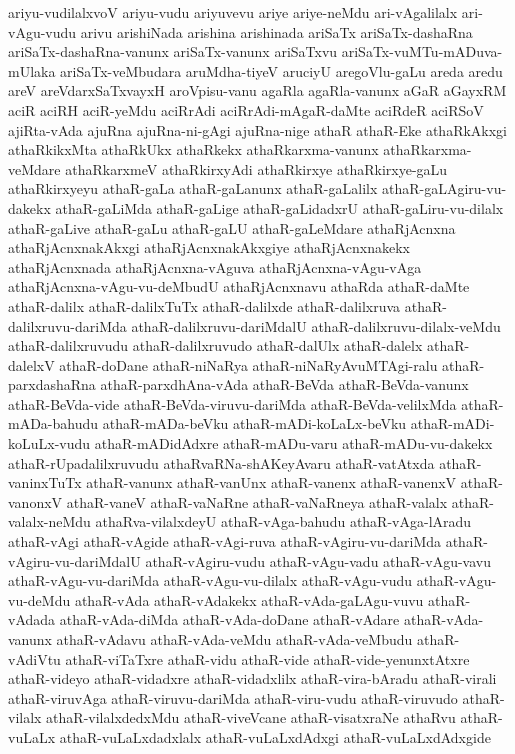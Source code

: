 {ariyu-vudilalxvoV
ariyu-vudu
ariyuvevu
ariye
ariye-neMdu
ari-vAgalilalx
ari-vAgu-vudu
arivu
arishiNada
arishina
arishinada
ariSaTx
ariSaTx-dashaRna
ariSaTx-dashaRna-vanunx
ariSaTx-vanunx
ariSaTxvu
ariSaTx-vuMTu-mADuva-mUlaka
ariSaTx-veMbudara
aruMdha-tiyeV
aruciyU
aregoVlu-gaLu
areda
aredu
areV
areVdarxSaTxvayxH
aroVpisu-vanu
agaRla
agaRla-vanunx
aGaR
aGayxRM
aciR
aciRH
aciR-yeMdu
aciRrAdi
aciRrAdi-mAgaR-daMte
aciRdeR
aciRSoV
ajiRta-vAda
ajuRna
ajuRna-ni-gAgi
ajuRna-nige
athaR
athaR-Eke
athaRkAkxgi
athaRkikxMta
athaRkUkx
athaRkekx
athaRkarxma-vanunx
athaRkarxma-veMdare
athaRkarxmeV
athaRkirxyAdi
athaRkirxye
athaRkirxye-gaLu
athaRkirxyeyu
athaR-gaLa
athaR-gaLanunx
athaR-gaLalilx
athaR-gaLAgiru-vu-dakekx
athaR-gaLiMda
athaR-gaLige
athaR-gaLidadxrU
athaR-gaLiru-vu-dilalx
athaR-gaLive
athaR-gaLu
athaR-gaLU
athaR-gaLeMdare
athaRjAcnxna
athaRjAcnxnakAkxgi
athaRjAcnxnakAkxgiye
athaRjAcnxnakekx
athaRjAcnxnada
athaRjAcnxna-vAguva
athaRjAcnxna-vAgu-vAga
athaRjAcnxna-vAgu-vu-deMbudU
athaRjAcnxnavu
athaRda
athaR-daMte
athaR-dalilx
athaR-dalilxTuTx
athaR-dalilxde
athaR-dalilxruva
athaR-dalilxruvu-dariMda
athaR-dalilxruvu-dariMdalU
athaR-dalilxruvu-dilalx-veMdu
athaR-dalilxruvudu
athaR-dalilxruvudo
athaR-dalUlx
athaR-dalelx
athaR-dalelxV
athaR-doDane
athaR-niNaRya
athaR-niNaRyAvuMTAgi-ralu
athaR-parxdashaRna
athaR-parxdhAna-vAda
athaR-BeVda
athaR-BeVda-vanunx
athaR-BeVda-vide
athaR-BeVda-viruvu-dariMda
athaR-BeVda-velilxMda
athaR-mADa-bahudu
athaR-mADa-beVku
athaR-mADi-koLaLx-beVku
athaR-mADi-koLuLx-vudu
athaR-mADidAdxre
athaR-mADu-varu
athaR-mADu-vu-dakekx
athaR-rUpadalilxruvudu
athaRvaRNa-shAKeyAvaru
athaR-vatAtxda
athaR-vaninxTuTx
athaR-vanunx
athaR-vanUnx
athaR-vanenx
athaR-vanenxV
athaR-vanonxV
athaR-vaneV
athaR-vaNaRne
athaR-vaNaRneya
athaR-valalx
athaR-valalx-neMdu
athaRva-vilalxdeyU
athaR-vAga-bahudu
athaR-vAga-lAradu
athaR-vAgi
athaR-vAgide
athaR-vAgi-ruva
athaR-vAgiru-vu-dariMda
athaR-vAgiru-vu-dariMdalU
athaR-vAgiru-vudu
athaR-vAgu-vadu
athaR-vAgu-vavu
athaR-vAgu-vu-dariMda
athaR-vAgu-vu-dilalx
athaR-vAgu-vudu
athaR-vAgu-vu-deMdu
athaR-vAda
athaR-vAdakekx
athaR-vAda-gaLAgu-vuvu
athaR-vAdada
athaR-vAda-diMda
athaR-vAda-doDane
athaR-vAdare
athaR-vAda-vanunx
athaR-vAdavu
athaR-vAda-veMdu
athaR-vAda-veMbudu
athaR-vAdiVtu
athaR-viTaTxre
athaR-vidu
athaR-vide
athaR-vide-yenunxtAtxre
athaR-videyo
athaR-vidadxre
athaR-vidadxlilx
athaR-vira-bAradu
athaR-virali
athaR-viruvAga
athaR-viruvu-dariMda
athaR-viru-vudu
athaR-viruvudo
athaR-vilalx
athaR-vilalxdedxMdu
athaR-viveVcane
athaR-visatxraNe
athaRvu
athaR-vuLaLx
athaR-vuLaLxdadxlalx
athaR-vuLaLxdAdxgi
athaR-vuLaLxdAdxgide
}
